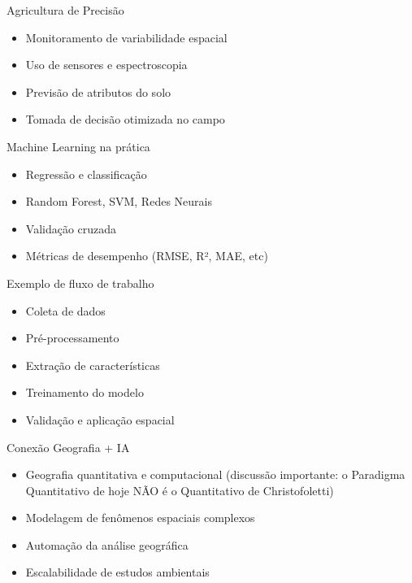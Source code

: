 \documentclass{beamer}
\begin{document}
\begin{frame}{Agricultura de Precisão}
\begin{itemize}
    \item Monitoramento de variabilidade espacial
    \item Uso de sensores e espectroscopia
    \item Previsão de atributos do solo
    \item Tomada de decisão otimizada no campo
\end{itemize}
\end{frame}

\begin{frame}{Machine Learning na prática}
\begin{itemize}
    \item Regressão e classificação
    \item Random Forest, SVM, Redes Neurais
    \item Validação cruzada
    \item Métricas de desempenho (RMSE, R², MAE, etc)
\end{itemize}
\end{frame}

\begin{frame}{Exemplo de fluxo de trabalho}
\begin{itemize}
    \item Coleta de dados
    \item Pré-processamento
    \item Extração de características
    \item Treinamento do modelo
    \item Validação e aplicação espacial
\end{itemize}
\end{frame}

\begin{frame}{Conexão Geografia + IA}
\begin{itemize}
    \item Geografia quantitativa e computacional (discussão importante: o Paradigma Quantitativo de hoje NÃO é o Quantitativo de Christofoletti)
    \item Modelagem de fenômenos espaciais complexos
    \item Automação da análise geográfica
    \item Escalabilidade de estudos ambientais
\end{itemize}
\end{frame}
\end{document}
